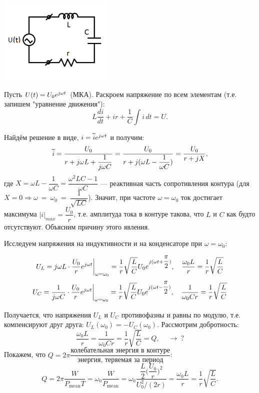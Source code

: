 \documentclass[../main/main.tex]{subfiles}
\begin{document}
\begin{minipage}{6cm}
\centering
\includegraphics[scale=0.7]{../section01/images/RLC_lin/RLC_lin.png} %
\end{minipage} \hfill   
\begin{minipage}{10cm}
Пусть $U(t) = U_0 e^{j\omega t}$ (МКА).
Раскроем напряжение по всем элементам (т.е. запишем "уравнение движения"):
$$L \dfrac{di}{dt} + i r + \dfrac{1}{C} \displaystyle \int i \, dt = U.$$
\end{minipage}

Найдём решение в виде, $i = \widetilde{i} e^{j\omega t}$ и получим:
$$\widetilde{i} = \dfrac{U_0}{r + j\omega L + \dfrac{1}{j\omega C}} = \dfrac{U_0}{r + j (\omega L - \dfrac{1}{\omega C})} = \dfrac{U_0}{r + jX},$$
где $X = \omega L - \dfrac{1}{\omega C} = \dfrac{\omega^2 LC - 1}{\omega C}$ --- реактивная часть сопротивления контура (для $X = 0 \Rightarrow \omega~=~\omega_0~=~\dfrac{1}{\sqrt{LC}}$). Значит, при частоте $\omega = \omega_0$ ток достигает максимума $|i|_{max} = \dfrac{U_0}{r}$, т.е. амплитуда тока в контуре такова, что $L$ и $C$ как будто отсутствуют. Объясним причину этого явления.

Исследуем напряжения на индуктивности и на конденсаторе при $\omega = \omega_0$:

$$U_L = j\omega L \cdot \dfrac{U_0}{r} e^{j\omega t} \bigg|_{\omega = \omega_0} = \dfrac{1}{r} \sqrt{\dfrac{L}{C}} U_0 e^{j(\omega t + \dfrac{\pi}{2})}, \quad \dfrac{\omega_0 L}{r} = \dfrac{1}{r} \sqrt{\dfrac{L}{C}}$$
$$U_C = \dfrac{1}{j\omega C} \cdot \dfrac{U_0}{r} e^{j\omega t} \bigg|_{\omega = \omega_0} = \dfrac{1}{r} \sqrt{\dfrac{L}{C}} U_0 e^{j(\omega t - \dfrac{\pi}{2})}, \quad \dfrac{1}{\omega_0 Cr} = \dfrac{1}{r} \sqrt{\dfrac{L}{C}}$$

Получается, что напряжения $U_L$ и $U_C$ противофазны и равны по модулю, т.е. компенсируют друг друга: $U_L (\omega_0) = - U_C (\omega_0)$. Рассмотрим добротность:
$$\dfrac{\omega_0 L}{r} = \dfrac{1}{\omega_0 Cr} = \dfrac{1}{r} \sqrt{\dfrac{L}{C}} = Q,\quad ~\rightarrow~?$$
Покажем, что $Q = 2\pi \dfrac{\text{колебательная энергия в контуре}}{\text{энергия, теряемая за период}}$:
$$Q = 2\pi \dfrac{W}{P_{\text{mean}} T} = \omega_0 \dfrac{W}{P_{\text{mean}}} = \omega_0 \dfrac{\dfrac{L}{2} \bigg( \dfrac{U_0}{r} \bigg)^2}{U_0^2 / (2r)} = \dfrac{\omega_0 L}{r} = \dfrac{1}{r} \sqrt{\dfrac{L}{C}}.$$
\end{document}
